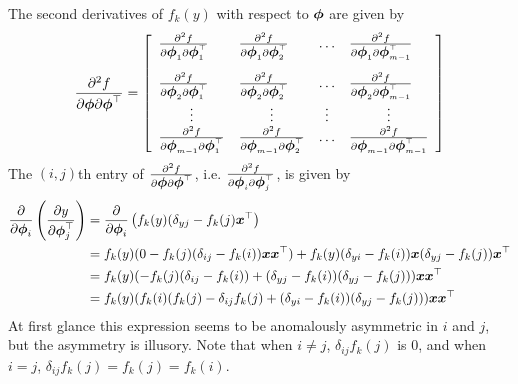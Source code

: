 The second derivatives of $f_k(y)$ with respect to $\mbox{$\boldsymbol{\phi}$}$ are given by
\[
\frac{\partial^2 f}{\partial \bphi \partial \bphi^{\top}} = 
\left [ \begin{array}{llcl}
        \frac{\partial^2 f}{\partial \bphi_1 \partial \bphi_1^{\top}} & 
        \frac{\partial^2 f}{\partial \bphi_1 \partial \bphi_2^{\top}} & 
        \ldots &
        \frac{\partial^2 f}{\partial \bphi_1 \partial \bphi_{m-1}^{\top}} \\[0.5cm]
        \frac{\partial^2 f}{\partial \bphi_2 \partial \bphi_1^{\top}} & 
        \frac{\partial^2 f}{\partial \bphi_2 \partial \bphi_2^{\top}} & 
        \ldots &
        \frac{\partial^2 f}{\partial \bphi_2 \partial \bphi_{m-1}^{\top}} \\ 
        \multicolumn{1}{c}{\vdots} &
        \multicolumn{1}{c}{\vdots} &
        \multicolumn{1}{c}{\vdots} &
        \multicolumn{1}{c}{\vdots} \\
        \frac{\partial^2 f}{\partial \bphi_{m-1} \partial \bphi_1^{\top}} & 
        \frac{\partial^2 f}{\partial \bphi_{m-1} \partial \bphi_2^{\top}} & 
        \ldots &
        \frac{\partial^2 f}{\partial \bphi_{m-1} \partial \bphi_{m-1}^{\top}}
        \end{array}
\right]
\]
The $(i,j)$th entry of $\frac{\partial^2 f}{\partial \mbox{$\boldsymbol{\phi}$} \partial
\mbox{$\boldsymbol{\phi}$}^{\top}}$, i.e.  $\frac{\partial^2 f}{\partial \mbox{$\boldsymbol{\phi}$}_i \partial
\mbox{$\boldsymbol{\phi}$}_j^{\top}}$, is given by
\begin{align*}
 \frac{\partial}{\partial \mbox{$\boldsymbol{\phi}$}_i} \left (
        \frac{\partial y}{\partial \mbox{$\boldsymbol{\phi}$}_j^{\top}} \right )
 &=\frac{\partial}{\partial \mbox{$\boldsymbol{\phi}$}_i} \left (f_k(y)(\delta_{yj} - f_k(j)\mbox{$\boldsymbol{x}$}^{\top}
                                     \right) \\
 &= f_k(y)(0 - f_k(j)(\delta_{ij} - f_k(i))\mbox{$\boldsymbol{x}$}\mbox{$\boldsymbol{x}$}^{\top}) +
    f_k(y)(\delta_{yi} - f_k(i))\mbox{$\boldsymbol{x}$} (\delta_{yj}- f_k(j))\mbox{$\boldsymbol{x}$}^{\top} \\
 &= f_k(y)(-f_k(j)(\delta_{ij} - f_k(i)) + (\delta_{yj} - f_k(i))(\delta_{yj} - f_k(j)))
    \mbox{$\boldsymbol{x}$} \mbox{$\boldsymbol{x}$}^{\top} \\
 &= f_k(y)(f_k(i)(f_k(j) - \delta_{ij}f_k(j) + (\delta_{yi} - f_k(i))
                                               (\delta_{yj} - f_k(j))) \mbox{$\boldsymbol{x}$} \mbox{$\boldsymbol{x}$}^{\top}
\end{align*}
At first glance this expression seems to be anomalously asymmetric in $i$ and $j$,
but the asymmetry is illusory.  Note  that when $i \neq j$, $\delta_{ij}f_k(j)$
is 0, and when $i=j$, $\delta_{ij}f_k(j) = f_k(j) = f_k(i)$.

